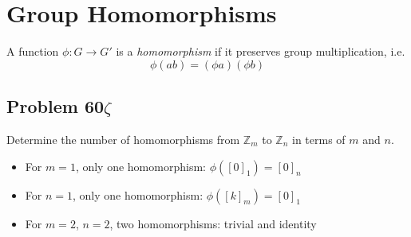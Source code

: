 \chapter{Group Homomorphisms}
A function $\phi : G \rightarrow G'$ is a \textit{homomorphism} if it preserves
group multiplication, i.e.
$$
\phi (a b) = (\phi a) (\phi b)
$$

\section{Problem 60$\zeta$}
Determine the number of homomorphisms from $\mathbb{Z}_m$ to $\mathbb{Z}_n$ in 
terms of $m$ and $n$.

\begin{itemize}
\item For $m=1$, only one homomorphism: $\phi([0]_1) = [0]_n$
\item For $n=1$, only one homomorphism: $\phi([k]_m) = [0]_1$
\item For $m=2$, $n=2$, two homomorphisms: trivial and identity

\end{itemize}

